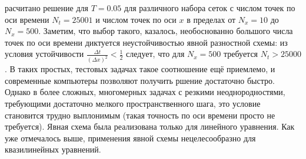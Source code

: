 расчитано решение для $T = 0.05$ для различного набора сеток с числом точек по оси времени $N_t = 25001$ и числом точек по оси $x$ в пределах от $N_x = 10$ до $N_x = 500$.
Заметим, что выбор такого, казалось, необоснованно большого числа точек по оси времени диктуется неустойчивостью явной разностной схемы: из условия устойчивости $\frac{\Delta t}{(\Delta x)^2} < \frac{1}{2}$ следует, что для $N_x = 500$ требуется $N_t > 25000$.
В таких простых, тестовых задачах такое соотношение ещё приемлемо, и современные компьютеры позволяют получить ршение достаточно быстро.
Однако в более сложных, многомерных задачах с резкими неоднородностями, требующими достаточно мелкого пространственного шага, это условие становится трудно выплонимым (такая точность по оси времени просто не требуется).
Явная схема была реализована только для линейного уравнения.
Как уже отмечалось выше, применения явной схемы нецелесообразно для квазилинейных уравнений.




